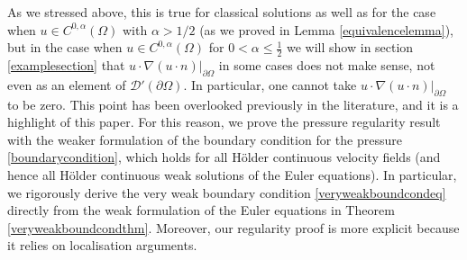 \documentclass[12pt,a4paper]{article}
\theoremstyle{definition}
\theoremstyle{remark}
\numberwithin{equation}{section}
\begin{document}
As we stressed above, this is true for classical solutions as well as for the case when $u\in C^{0,\alpha} (\Omega)$ with $\alpha > 1/2$ (as we proved in Lemma \ref{equivalencelemma}), but in the case when $u \in C^{0, \alpha} (\Omega)$ for $0 < \alpha \leq \frac{1}{2}$ we will show in section \ref{examplesection} that $u \cdot \nabla (u \cdot n) \lvert_{\partial \Omega}$ in some cases does not make sense, not even as an element of $\mathcal{D}' (\partial \Omega)$. In particular, one cannot take $u \cdot \nabla (u \cdot n) \lvert_{\partial \Omega}$ to be zero. This point has been overlooked previously in the literature, and it is a highlight of this paper. For this reason, we prove the pressure regularity result with the weaker formulation of the boundary condition for the pressure \eqref{boundarycondition}, which holds for all H\"older continuous velocity fields (and hence all Hölder continuous weak solutions of the Euler equations). In particular, we rigorously derive the very weak boundary condition \eqref{veryweakboundcondeq} directly from the weak formulation of the Euler equations in Theorem \ref{veryweakboundcondthm}. Moreover, our regularity proof is more explicit because it relies on localisation arguments. 
\end{document}
